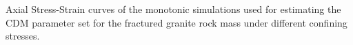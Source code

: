 \label{fig:fitted1} Axial Stress-Strain curves of the monotonic simulations used for estimating the CDM parameter set for the fractured granite rock mass under different confining stresses.